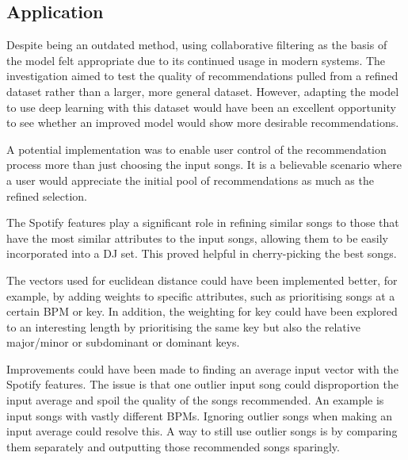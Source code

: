 \subsection{Application}
Despite being an outdated method, using collaborative filtering as the basis of the model felt appropriate due to its continued usage in modern systems. The investigation aimed to test the quality of recommendations pulled from a refined dataset rather than a larger, more general dataset. However, adapting the model to use deep learning with this dataset would have been an excellent opportunity to see whether an improved model would show more desirable recommendations.

A potential implementation was to enable user control of the recommendation process more than just choosing the input songs. It is a believable scenario where a user would appreciate the initial pool of recommendations as much as the refined selection.

The Spotify features play a significant role in refining similar songs to those that have the most similar attributes to the input songs, allowing them to be easily incorporated into a DJ set. This proved helpful in cherry-picking the best songs. 

The vectors used for euclidean distance could have been implemented better, for example, by adding weights to specific attributes, such as prioritising songs at a certain BPM or key. In addition, the weighting for key could have been explored to an interesting length by prioritising the same key but also the relative major/minor or subdominant or dominant keys.

Improvements could have been made to finding an average input vector with the Spotify features. The issue is that one outlier input song could disproportion the input average and spoil the quality of the songs recommended. An example is input songs with vastly different BPMs. Ignoring outlier songs when making an input average could resolve this. A way to still use outlier songs is by comparing them separately and outputting those recommended songs sparingly.

